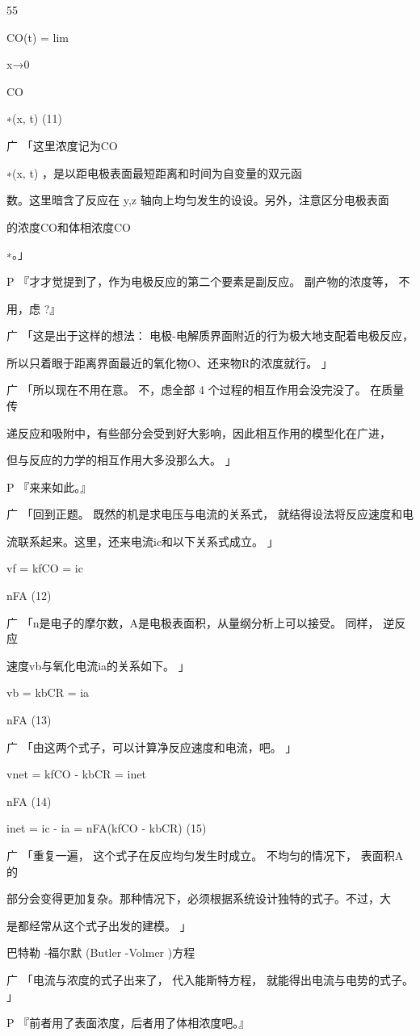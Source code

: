 55\par
CO(t) = lim\par
x→0\par
CO\par
∗(x, t) (11)\par
广 「这里浓度记为CO\par
∗(x, t) ，是以距电极表面最短距离和时间为自变量的双元函\par
数。这里暗含了反应在 y,z 轴向上均匀发生的设设。另外，注意区分电极表面\par
的浓度CO和体相浓度CO\par
∗。」\par
P 『才才觉提到了，作为电极反应的第二个要素是副反应。 副产物的浓度等， 不\par
用，虑 ?』\par
广 「这是出于这样的想法： 电极-电解质界面附近的行为极大地支配着电极反应，\par
所以只着眼于距离界面最近的氧化物O、还来物R的浓度就行。 」\par
广 「所以现在不用在意。 不，虑全部 4 个过程的相互作用会没完没了。 在质量传\par
递反应和吸附中，有些部分会受到好大影响，因此相互作用的模型化在广进，\par
但与反应的力学的相互作用大多没那么大。 」\par
P 『来来如此。』\par
广 「回到正题。 既然的机是求电压与电流的关系式， 就结得设法将反应速度和电\par
流联系起来。这里，还来电流ic和以下关系式成立。 」\par
vf = kfCO = ic\par
nFA (12)\par
广 「n是电子的摩尔数，A是电极表面积，从量纲分析上可以接受。 同样， 逆反应\par
速度vb与氧化电流ia的关系如下。 」\par
vb = kbCR = ia\par
nFA (13)\par
广 「由这两个式子，可以计算净反应速度和电流，吧。 」\par
vnet = kfCO - kbCR = inet\par
nFA (14)\par
inet = ic - ia = nFA(kfCO - kbCR) (15)\par
广 「重复一遍， 这个式子在反应均匀发生时成立。 不均匀的情况下， 表面积A 的\par
部分会变得更加复杂。那种情况下，必须根据系统设计独特的式子。不过，大\par
是都经常从这个式子出发的建模。 」\par
巴特勒 -福尔默 (Butler -Volmer )方程\par
广 「电流与浓度的式子出来了， 代入能斯特方程， 就能得出电流与电势的式子。 」\par
P 『前者用了表面浓度，后者用了体相浓度吧。』\par

